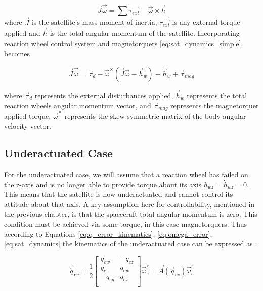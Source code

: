 \begin{equation} \label{eq:sat_dynamics_simple}
\vec{J}\vec{\dot{\omega}} = \sum{\vec{\tau_{ext}}} - \vec{\omega}\times\vec{h}
\end{equation}
where $\vec{J}$ is the satellite's mass moment of inertia, $\vec{\tau_{ext}}$ is any external torque applied and $\vec{h}$ is the total angular momentum of the satellite. Incorporating reaction wheel control system and magnetorquers \autoref{eq:sat_dynamics_simple} becomes

\begin{equation} \label{eq:sat_dynamics}
\vec{J}\vec{\dot{\omega}} = \vec{\tau}_d -\vec{\omega}^\times(\vec{J}\vec{\omega}-\vec{h}_w)-\dot{\vec{h}}_w + \vec{\tau}_{mag}
\end{equation}

where $\vec{\tau}_d$ represents the external disturbances applied, $\vec{h}_w$ represents the total reaction wheels angular momentum vector, and $\vec{\tau}_{mag}$ represents the magnetorquer applied torque. $\vec{\omega}^\times$ represents the skew symmetric matrix of the body angular velocity vector.

\subsection{Underactuated Case}
\label{subsec:underactuated}
For the underactuated case, we will assume that a reaction wheel has failed on the z-axis and is no longer able to provide torque about its axis $h_{wz} = \dot{h}_{wz} = 0$. This means that the satellite is now underactuated and cannot control its attitude about that axis. A key assumption here for controllability, mentioned in the previous chapter, is that the spacecraft total angular momentum is zero. This condition must be achieved via some torque, in this case magnetorquers. Thus according to Equations \eqref{eq:q_error_kinematics}, \eqref{eq:omega_error}, \eqref{eq:sat_dynamics} the kinematics of the underactuated case can be expressed as \cite{nadafiRobustBacksteppingAttitude2021}:

\begin{equation}
    \vec{\dot{q}}_{ev} = \frac{1}{2} \begin{bmatrix} q_{ew} & -q_{ez} \\ 
q_{ez} & q_{ew} \\
-q_{ey} & q_{ex} \\
\end{bmatrix} \vec{\omega}_e^r = \vec{A}(\vec{q}_{ev}) \vec{\omega}_e^r
\end{equation}

